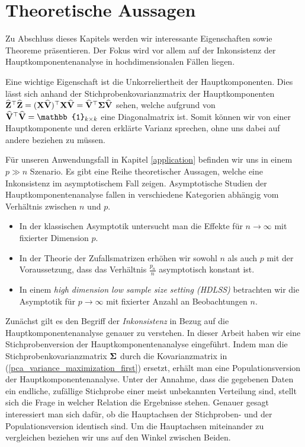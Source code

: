 

\section{Theoretische Aussagen}
\label{pca_theorems}

Zu Abschluss dieses Kapitels werden wir interessante Eigenschaften sowie Theoreme präsentieren. Der Fokus wird vor allem auf der Inkonsistenz der Hauptkomponentenanalyse in hochdimensionalen Fällen liegen.

Eine wichtige Eigenschaft ist die Unkorreliertheit der Hauptkomponenten. Dies lässt sich anhand der Stichprobenkovarianzmatrix der Hauptkomponenten $\widehat{\mathbf{Z}}^{\top} \widehat{\mathbf{Z}} = (\mathbf{X} \widehat{\mathbf{V}})^{\top}\mathbf{X} \widehat{\mathbf{V}} = \widehat{\mathbf{V}}^{\top}\mathbf{\Sigma}\widehat{\mathbf{V}}$ sehen, welche aufgrund von $\widehat{\mat V}^{\top} \widehat{\mat V} = \mat{\mathbb{1}}_{k \times k}$ eine Diagonalmatrix ist. Somit können wir von einer Hauptkomponente und deren erklärte Varianz sprechen, ohne uns dabei auf andere beziehen zu müssen.

Für unseren Anwendungsfall in Kapitel \ref{application} befinden wir uns in einem $p \gg n$ Szenario. Es gibt eine Reihe theoretischer Aussagen, welche eine Inkonsistenz im asymptotischem Fall zeigen. Asymptotische Studien der Hauptkomponentenanalyse fallen in verschiedene Kategorien abhängig vom Verhältnis zwischen $n$ und $p$.
\begin{itemize}
\item In der klassischen Asymptotik untersucht man die Effekte für $n \rightarrow \infty$ mit fixierter Dimension $p$.
\item In der Theorie der Zufallsmatrizen erhöhen wir sowohl $n$ als auch $p$ mit der Voraussetzung, dass das Verhältnis $\frac{p_n}{n}$ asymptotisch konstant ist.
\item In einem \textit{high dimension low sample size setting (HDLSS)} betrachten wir die Asymptotik für $p \rightarrow \infty$ mit fixierter Anzahl an Beobachtungen $n$.
\end{itemize}
Zunächst gilt es den Begriff der \textit{Inkonsistenz} in Bezug auf die Hauptkomponentenanalyse genauer zu verstehen. In dieser Arbeit haben wir eine Stichprobenversion der Hauptkomponentenanalyse eingeführt. Indem man die Stichprobenkovarianzmatrix $\mathbf{\Sigma}$ durch die Kovarianzmatrix in (\ref{pca_variance_maximization_first}) ersetzt, erhält man eine Populationsversion der Hauptkomponentenanalyse. Unter der Annahme, dass die gegebenen Daten ein endliche, zufällige Stichprobe einer meist unbekannten Verteilung sind, stellt sich die Frage in welcher Relation die Ergebnisse stehen. Genauer gesagt interessiert man sich dafür, ob die Hauptachsen der Stichproben- und der Populationsversion identisch sind. Um die Hauptachsen miteinander zu vergleichen beziehen wir uns auf den Winkel zwischen Beiden.


